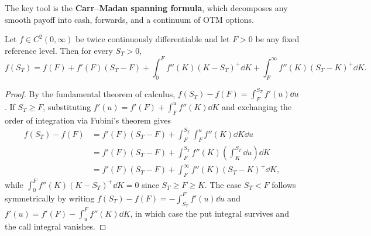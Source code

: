 The key tool is the \textbf{Carr--Madan spanning formula}, which decomposes any smooth payoff into cash, forwards, and a continuum of OTM options.

\begin{theorem}
    \label{thm:ch05-carr-madan}
    Let $f \in C^2(0, \infty)$ be twice continuously differentiable and let $F > 0$ be any fixed reference level. Then for every $S_T > 0$,
    \begin{equation}
        \label{eq:ch05-carr-madan}
        f(S_T) = f(F) + f'(F)(S_T - F)
        + \int_0^F f''(K)(K - S_T)^+\dd K
        + \int_F^{\infty} f''(K)(S_T - K)^+\dd K.
    \end{equation}
\end{theorem}
\begin{proof}
    By the fundamental theorem of calculus, $f(S_T) - f(F) = \int_F^{S_T} f'(u)\dd u$. If $S_T \ge F$, substituting $f'(u) = f'(F) + \int_F^u f''(K)\dd K$ and exchanging the order of integration via Fubini's theorem gives
    \begin{align*}
        f(S_T) - f(F)
        &= f'(F)(S_T - F) + \int_F^{S_T} \int_F^u f''(K)\dd K \dd u \\
        &= f'(F)(S_T - F) + \int_F^{S_T} f''(K)\left(\int_K^{S_T} \dd u\right)\dd K \\
        &= f'(F)(S_T - F) + \int_F^{\infty} f''(K)(S_T - K)^+\dd K,
    \end{align*}
    while $\int_0^F f''(K)(K - S_T)^+\dd K = 0$ since $S_T \ge F \ge K$. The case $S_T < F$ follows symmetrically by writing $f(S_T) - f(F) = -\int_{S_T}^F f'(u)\dd u$ and $f'(u) = f'(F) - \int_u^F f''(K)\dd K$, in which case the put integral survives and the call integral vanishes.
\end{proof}

